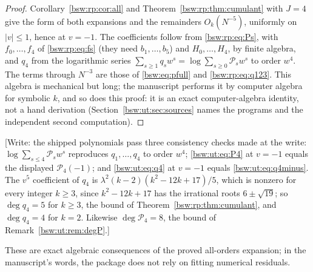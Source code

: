 \documentclass[11pt,letterpaper]{article}
\theoremstyle{definition}
\theoremstyle{remark}
\begin{document}
\begin{proof}
Corollary~\ref{bsw:rp:cor:all} and Theorem~\ref{bsw:rp:thm:cumulant} with
$J=4$ give the form of both expansions and the remainders $O_k(N^{-5})$,
uniformly on $|v|\le1$, hence at $v=-1$.  The coefficients follow from
\eqref{bsw:rp:eq:Ps}, with $f_0,\ldots,f_4$ of \eqref{bsw:rp:eq:fs} (they
need $b_1,\ldots,b_5$) and $H_0,\ldots,H_4$, by finite algebra, and $q_4$
from the logarithmic series
$\sum_{s\ge1}q_sw^s=\log\sum_{s\ge0}\mathcal P_sw^s$ to order $w^4$.  The
terms through $N^{-3}$ are those of \eqref{bsw:eq:pfull} and
\eqref{bsw:rp:eq:q123}.  This algebra is mechanical but long; the
manuscript performs it by computer algebra for symbolic $k$, and so does
this proof: it is an exact computer-algebra identity, not a hand
derivation (Section~\ref{bsw:ut:sec:sources} names the programs and the
independent second computation).
\end{proof}

[Write: the shipped polynomials pass three consistency checks made at the
write: $\log\sum_{s\le4}\mathcal P_sw^s$ reproduces $q_1,\ldots,q_4$ to
order $w^4$; \eqref{bsw:ut:eq:P4} at $v=-1$ equals the displayed
$\mathcal P_4(-1)$; and \eqref{bsw:ut:eq:q4} at $v=-1$ equals
\eqref{bsw:ut:eq:q4minus}.  The $v^5$ coefficient of $q_4$ is
$\lambda^2(k-2)(k^2-12k+17)/5$, which is nonzero for every integer
$k\ge3$, since $k^2-12k+17$ has the irrational roots $6\pm\sqrt{19}$; so
$\deg q_4=5$ for $k\ge3$, the bound of Theorem~\ref{bsw:rp:thm:cumulant},
and $\deg q_4=4$ for $k=2$.  Likewise $\deg\mathcal P_4=8$, the bound of
Remark~\ref{bsw:ut:rem:degP}.]

These are exact algebraic consequences of the proved all-orders
expansion; in the manuscript's words, the package does not rely on fitting
numerical residuals.
\end{document}
